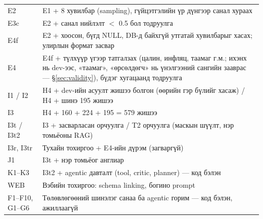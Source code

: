 \begin{longtable}{p{1.8cm}p{12.2cm}}
E2 & E1 + 8 хувилбар (sampling), гүйцэтгэлийн үр дүнгээр санал хураах \\
E3c & E2 + санал нийлэлт $<$ 0.5 бол тодруулга \\
E4f & E2 + хоосон, бүгд NULL, DB-д байхгүй утгатай хувилбарыг хасах; улирлын формат засвар \\
E4 & E4f + түлхүүр үгээр татгалзах (цалин, инфляц, таамаг г.м.; ихэнх нь dev-ээс, «таамаг», «өрсөлдөгч» нь үнэлгээний сангийн зааврас --- \S\ref{sec:validity}), бүдэг хугацаанд тодруулга \\
I1 / I2 & H4 + dev-ийн асуулт жишээ болгон (өөрийн гэр бүлийг хасаж) / H4 + шинэ 195 жишээ \\
I3 & H4 + 160 + 224 + 195 = 579 жишээ \\
I3t / I3t2 & I3 + засварласан орчуулга / T2 орчуулга (маскын шүүлт, нэр томьёоны RAG) \\
I3r, I3tr & Тухайн тохиргоо + E4-ийн дүрэм (загваргүй) \\
J1 & I3t + нэр томьёог англиар \\
K1--K3 & I3t2 + agentic давталт (tool, critic, planner) --- код бэлэн \\
WEB & Вэбийн тохиргоо: schema linking, богино prompt \\
F1--F10, G1--G6 & Төлөвлөгөөний шинэлэг санаа ба agentic горим --- код бэлэн, ажиллаагүй \\
\bottomrule
\end{longtable}
